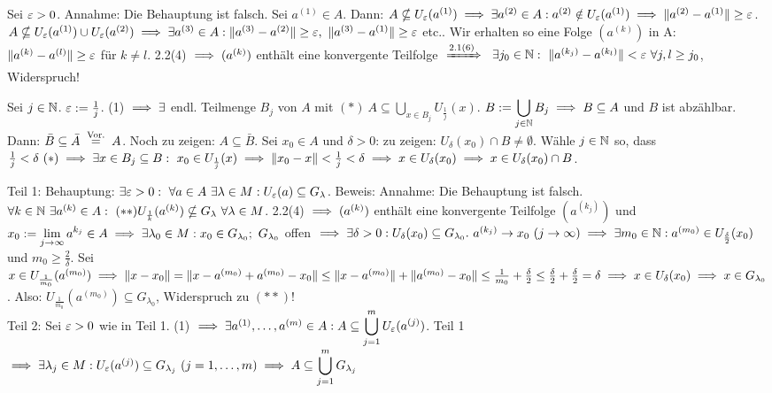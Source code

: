 \documentclass[a4paper,oneside,DIV15,BCOR12mm,chapterprefix=true,headings=onelinechapter]{scrbook}
\begin{document}
\begin{beweise}
\item Sei $\varepsilon>0$. Annahme: Die Behauptung ist falsch. Sei $a^{(1)}\in A$. Dann: $A\nsubseteq U_{\varepsilon}(a^{(1)})\implies\exists a^{(2)}\in A: a^{(2)}\notin U_\varepsilon(a^{(1)})\implies\|a^{(2)}-a^{(1)}\|\ge\varepsilon$. $A\nsubseteq U_\ep(a^{(1)})\cup U_\ep(a^{(2)})\folgt\exists a^{(3)} \in A: \|a^{(3)}-a^{(2)}\|\ge\ep,\ \|a^{(3)}-a^{(1)}\|\ge\ep$ etc.. Wir erhalten so eine Folge $(a^{(k)})$ in A: $\|a^{(k)}-a^{(l)}\|\ge\varepsilon$ für $k\ne l$. 2.2(4) $\implies (a^{(k)})$ enthält eine konvergente Teilfolge $\folgtnach{2.1(6)}\ \exists j_0 \in\MdN:\ \|a^{(k_j)}-a^{(k_l)}\|<\ep\ \forall j,l\ge j_0$, Widerspruch!
\item Sei $j\in\mathbb{N}$. $\varepsilon:=\frac{1}{j}$. (1) $\implies\exists$ endl. Teilmenge $B_j$ von $A$ mit $(*)\ A\subseteq \displaystyle\bigcup_{x \in B_j}U_{\frac{1}{j}}(x)$. $B:=\displaystyle\bigcup_{j\in\mathbb{N}}B_j\implies B\subseteq A$ und $B$ ist abzählbar. Dann: $\bar B\subseteq\bar A\gleichnach{Vor.}A$. Noch zu zeigen: $A\subseteq\bar B$. Sei $x_0\in A$ und $\delta>0$: zu zeigen: $U_\delta(x_0)\cap B\ne\emptyset$. Wähle $j\in\mathbb{N}$ so, dass $\frac{1}{j}<\delta\ (*)\implies\exists x \in B_j\subseteq B:\ x_0\in U_{\frac{1}{j}}(x)\implies \|x_0-x\|<\frac{1}{j}<\delta\implies x\in U_\delta(x_0)\implies x\in U_\delta(x_0)\cap B$.
\item Teil 1: Behauptung: $\exists \ep>0:\ \forall a \in A\ \exists\lambda\in M: U_\ep(a)\subseteq G_\lambda$. Beweis: Annahme: Die Behauptung ist falsch. $\forall k\in\mathbb{N}\ \exists a^{(k)}\in A:\ (**) U_{\frac{1}{k}}(a^{(k)})\nsubseteq G_\lambda\ \forall \lambda\in M$. 2.2(4) $\implies (a^{(k)})$ enthält eine konvergente Teilfolge $(a^{(k_j)})$ und $x_0:=\displaystyle\lim_{j\to\infty}a^{k_j}\in A\folgt\exists \lambda_0\in M: x_0 \in G_{\lambda_0};\ G_{\lambda_0}$ offen $\folgt\exists \delta>0: U_\delta(x_0)\subseteq G_{\lambda_0}.\ a^{(k_j)}\to x_0\ (j\to\infty)\folgt\exists m_0\in\MdN: a^{(m_0)}\in U_{\frac{\delta}{2}}(x_0)$ und $m_0\ge\frac{2}{\delta}$. Sei $x\in U_{\frac{1}{m_0}}(a^{(m_0)})\implies \|x-x_0\|=\|x-a^{(m_0)}+a^{(m_0)}-x_0\|\le\|x-a^{(m_0)}\|+\|a^{(m_0)}-x_0\|\le\frac{1}{m_0}+\frac{\delta}{2}\le\frac{\delta}{2}+\frac{\delta}{2}=\delta\implies x\in U_\delta(x_0)\implies x \in G_{\lambda_0}$. Also: $U_{\frac{1}{m_0}}(a^{(m_0)})\subseteq G_{\lambda_0}$, Widerspruch zu $(**)$!\\
Teil 2: Sei $\varepsilon>0$ wie in Teil 1. (1) $\implies\exists a^{(1)},\ldots,a^{(m)}\in A: A\subseteq\displaystyle\bigcup_{j=1}^mU_\varepsilon(a^{(j)})$. Teil 1 $\implies\exists \lambda_j\in M: U_\varepsilon(a^{(j)})\subseteq G_{\lambda_j}\ (j=1,\ldots,m)\implies A\subseteq \displaystyle\bigcup_{j=1}^m G_{\lambda_j}$ 
\end{beweise}
\end{document}
